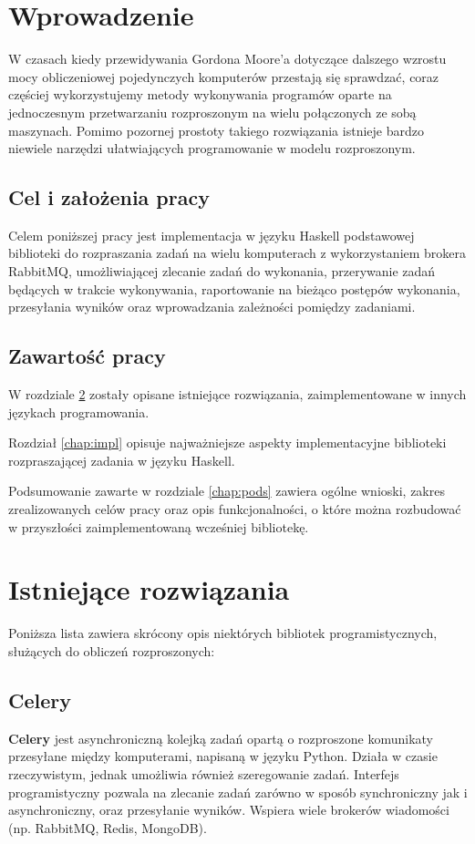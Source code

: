 
\chapter{Wprowadzenie}
W czasach kiedy przewidywania Gordona Moore'a dotyczące dalszego wzrostu mocy obliczeniowej pojedynczych komputerów przestają się sprawdzać, coraz częściej wykorzystujemy metody wykonywania programów oparte na jednoczesnym przetwarzaniu rozproszonym na wielu połączonych ze sobą maszynach. Pomimo pozornej prostoty takiego rozwiązania istnieje bardzo niewiele narzędzi ułatwiających programowanie w modelu rozproszonym.

\section{Cel i założenia pracy}
Celem poniższej pracy jest implementacja w języku Haskell podstawowej biblioteki do rozpraszania zadań na wielu komputerach z wykorzystaniem brokera RabbitMQ, umożliwiającej zlecanie zadań do wykonania, przerywanie zadań będących w trakcie wykonywania, raportowanie na bieżąco postępów wykonania, przesyłania wyników oraz wprowadzania zależności pomiędzy zadaniami.

\section{Zawartość pracy}
W rozdziale \ref{chap:exist} zostały opisane istniejące rozwiązania, zaimplementowane w innych językach programowania.

Rozdział \ref{chap:impl} opisuje najważniejsze aspekty implementacyjne biblioteki rozpraszającej zadania w języku Haskell.

Podsumowanie zawarte w rozdziale \ref{chap:pods} zawiera ogólne wnioski, zakres zrealizowanych celów pracy oraz opis funkcjonalności, o które można rozbudować w przyszłości zaimplementowaną wcześniej bibliotekę.
\chapter{Istniejące rozwiązania}
\label{chap:exist}

Poniższa lista zawiera skrócony opis niektórych bibliotek programistycznych, służących do obliczeń rozproszonych:
\section{Celery}
\textbf{Celery} jest asynchroniczną kolejką zadań opartą o rozproszone komunikaty przesyłane między komputerami, napisaną w języku Python. Działa w czasie rzeczywistym, jednak umożliwia również szeregowanie zadań. Interfejs programistyczny pozwala na zlecanie zadań zarówno w sposób synchroniczny jak i asynchroniczny, oraz przesyłanie wyników. Wspiera wiele brokerów wiadomości (np. RabbitMQ, Redis, MongoDB). 

